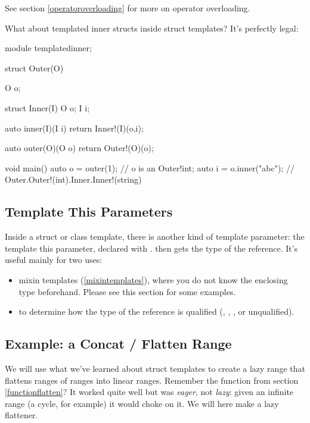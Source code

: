 See section \ref{operatoroverloading} for more on operator overloading.

What about templated inner structs inside struct templates? It's perfectly legal:

\begin{dcode}
module templatedinner;

struct Outer(O)
{
    O o;

    struct Inner(I)
    {
        O o;
        I i;
    }

    auto inner(I)(I i) { return Inner!(I)(o,i);}
}

auto outer(O)(O o) { return Outer!(O)(o);}
    
void main()
{
    auto o = outer(1); // o is an Outer!int;
    auto i = o.inner("abc"); // Outer.Outer!(int).Inner.Inner!(string)
}
\end{dcode}

\subsection{Template This Parameters}\label{this}


Inside a struct or class template, there is another kind of template parameter: the template this parameter, declared with  .  then gets the type of the  reference. It's useful mainly for two uses:

\begin{itemize}
\item mixin templates (\ref{mixintemplates}), where you do not know the enclosing type beforehand. Please see this section for some examples.
\item to determine how the type of the  reference is qualified (, , ,  or unqualified).
\end{itemize}

\subsection{Example: a Concat / Flatten Range}\label{structflatten}

We will use what we've learned about struct templates to create a lazy range that flattens ranges of ranges into linear ranges. Remember the  function from section \ref{functionflatten}? It worked quite well but was \emph{eager}, not \emph{lazy}: given an infinite range (a cycle, for example) it would choke on it. We will here make a lazy flattener.

